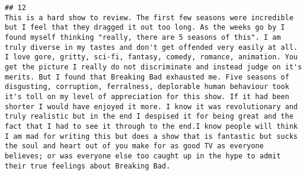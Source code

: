 \documentclass[
]{article}
\begin{document}
\begin{verbatim}
## 12                                                                                                                                                                                                                                                                                                                                                                                                                                                                                                                                                                                                                                                                                                                                                                                                                                                                                                                                                                                                                                                                                                          This is a hard show to review. The first few seasons were incredible but I feel that they dragged it out too long. As the weeks go by I found myself thinking "really, there are 5 seasons of this". I am truly diverse in my tastes and don't get offended very easily at all. I love gore, gritty, sci-fi, fantasy, comedy, romance, animation. You get the picture I really do not discriminate and instead judge on it's merits. But I found that Breaking Bad exhausted me. Five seasons of disgusting, corruption, ferralness, deplorable human behaviour took it's toll on my level of appreciation for this show. If it had been shorter I would have enjoyed it more. I know it was revolutionary and truly realistic but in the end I despised it for being great and the fact that I had to see it through to the end.I know people will think I am mad for writing this but does a show that is fantastic but sucks the soul and heart out of you make for as good TV as everyone believes; or was everyone else too caught up in the hype to admit their true feelings about Breaking Bad.

\end{verbatim}
\end{document}
